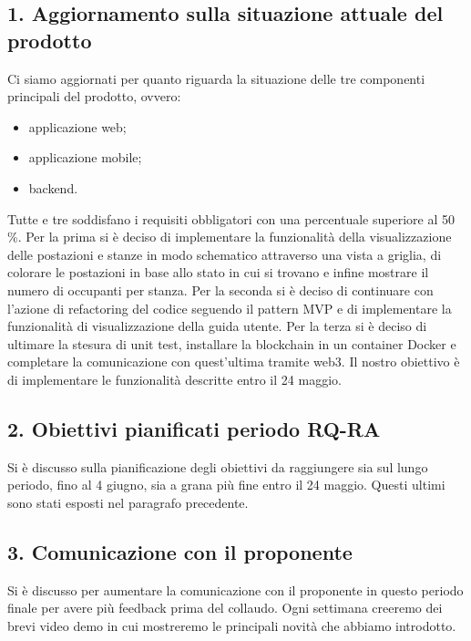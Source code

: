 \subsection*{\hypertarget{link1}{1. Aggiornamento sulla situazione attuale del prodotto}}
Ci siamo aggiornati per quanto riguarda la situazione delle tre componenti principali del prodotto, ovvero:
\begin{itemize}
	\item applicazione web;
	\item applicazione mobile;
	\item backend.
\end{itemize}
Tutte e tre soddisfano i requisiti obbligatori con una percentuale superiore al 50 \%.
Per la prima si è deciso di implementare la funzionalità della visualizzazione delle postazioni e stanze in modo schematico attraverso una vista a griglia, di colorare le postazioni in base allo stato in cui si trovano e infine mostrare il numero di occupanti per stanza.
Per la seconda si è deciso di continuare con l'azione di refactoring del codice seguendo il pattern MVP e di implementare la funzionalità di visualizzazione della guida utente.
Per la terza si è deciso di ultimare la stesura di unit test, installare la blockchain in un container Docker e completare la comunicazione con quest'ultima tramite web3.
Il nostro obiettivo è di implementare le funzionalità descritte entro il 24 maggio.
\subsection*{2. Obiettivi pianificati periodo RQ-RA}
Si è discusso sulla pianificazione degli obiettivi da raggiungere sia sul lungo periodo, fino al 4 giugno, sia a grana più fine entro il 24 maggio. Questi ultimi sono stati esposti nel paragrafo precedente.
\subsection*{\hypertarget{link3}{3. Comunicazione con il proponente}}
Si è discusso per aumentare la comunicazione con il proponente in questo periodo finale per avere più feedback prima del collaudo. Ogni settimana creeremo dei brevi video demo in cui mostreremo le principali novità che abbiamo introdotto.

